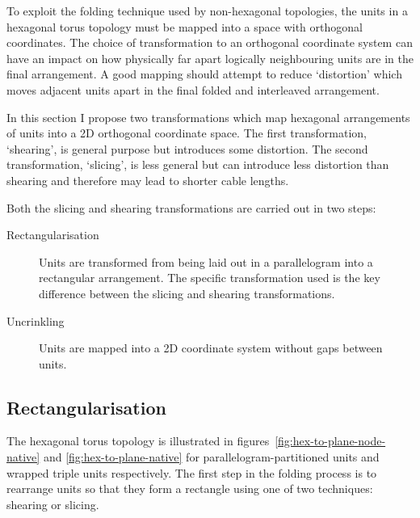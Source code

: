 		To exploit the folding technique used by non-hexagonal topologies, the
		units in a hexagonal torus topology must be mapped into a space with
		orthogonal coordinates. The choice of transformation to an orthogonal
		coordinate system can have an impact on how physically far apart logically
		neighbouring units are in the final arrangement. A good mapping should
		attempt to reduce `distortion' which moves adjacent units apart in the
		final folded and interleaved arrangement.
		
		In this section I propose two transformations which map hexagonal
		arrangements of units into a 2D orthogonal coordinate space. The first
		transformation, `shearing', is general purpose but introduces some
		distortion. The second transformation, `slicing', is less general but can
		introduce less distortion than shearing and therefore may lead to shorter
		cable lengths.
		
		Both the slicing and shearing transformations are carried out in two steps:
		
		\begin{description}
			
			\item[Rectangularisation] Units are transformed from being laid out in a
			parallelogram into a rectangular arrangement. The specific transformation
			used is the key difference between the slicing and shearing
			transformations.
			
			\item[Uncrinkling] Units are mapped into a 2D coordinate system without
			gaps between units.
			
		\end{description}
		
		\subsection{Rectangularisation}
			
			The hexagonal torus topology is illustrated in
			figures~\ref{fig:hex-to-plane-node-native} and
			\ref{fig:hex-to-plane-native} for parallelogram-partitioned units and
			wrapped triple units respectively. The first step in the folding process
			is to rearrange units so that they form a rectangle using one of two
			techniques: shearing or slicing.
			
